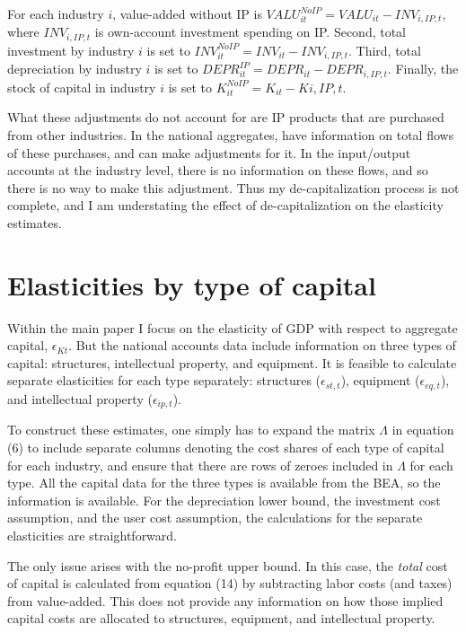 \documentclass[11pt]{article}
\begin{document}
For each industry $i$, value-added without IP is $VALU_{it}^{NoIP} = VALU_{it} - INV_{i,IP,t}$, where $INV_{i,IP,t}$ is own-account investment spending on IP. Second, total investment by industry $i$ is set to $INV_{it}^{NoIP} = INV_{it} - INV_{i,IP,t}$. Third, total depreciation by industry $i$ is set to $DEPR_{it}^{IP} = DEPR_{it} - DEPR_{i,IP,t}$. Finally, the stock of capital in industry $i$ is set to $K^{NoIP}_{it} = K_{it} - K{i,IP,t}$. 

What these adjustments do not account for are IP products that are purchased from other industries. In the national aggregates, \cite{ksz2020} have information on total flows of these purchases, and can make adjustments for it. In the input/output accounts at the industry level, there is no information on these flows, and so there is no way to make this adjustment. Thus my de-capitalization process is not complete, and I am understating the effect of de-capitalization on the elasticity estimates.

\section{Elasticities by type of capital}
Within the main paper I focus on the elasticity of GDP with respect to aggregate capital, $\epsilon_{Kt}$. But the national accounts data include information on three types of capital: structures, intellectual property, and equipment. It is feasible to calculate separate elasticities for each type separately: structures ($\epsilon_{st,t}$), equipment ($\epsilon_{eq,t}$), and intellectual property ($\epsilon_{ip,t}$). 

To construct these estimates, one simply has to expand the matrix $\Lambda$ in equation (6) to include separate columns denoting the cost shares of each type of capital for each industry, and ensure that there are rows of zeroes included in $\Lambda$ for each type. All the capital data for the three types is available from the BEA, so the information is available. For the depreciation lower bound, the investment cost assumption, and the user cost assumption, the calculations for the separate elasticities are straightforward. 

The only issue arises with the no-profit upper bound. In this case, the \textit{total} cost of capital is calculated from equation (14) by subtracting labor costs (and taxes) from value-added. This does not provide any information on how those implied capital costs are allocated to structures, equipment, and intellectual property. 
\end{document}
